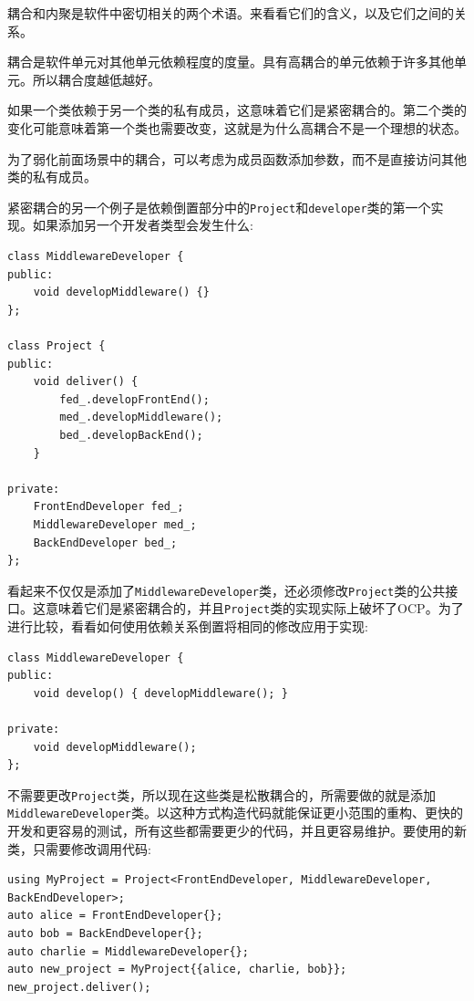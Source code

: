 
耦合和内聚是软件中密切相关的两个术语。来看看它们的含义，以及它们之间的关系。



耦合是软件单元对其他单元依赖程度的度量。具有高耦合的单元依赖于许多其他单元。所以耦合度越低越好。

如果一个类依赖于另一个类的私有成员，这意味着它们是紧密耦合的。第二个类的变化可能意味着第一个类也需要改变，这就是为什么高耦合不是一个理想的状态。

为了弱化前面场景中的耦合，可以考虑为成员函数添加参数，而不是直接访问其他类的私有成员。

紧密耦合的另一个例子是依赖倒置部分中的\texttt{Project}和\texttt{developer}类的第一个实现。如果添加另一个开发者类型会发生什么:


\begin{lstlisting}[style=styleCXX]
class MiddlewareDeveloper {
public:
	void developMiddleware() {}
};

class Project {
public:
	void deliver() {
		fed_.developFrontEnd();
		med_.developMiddleware();
		bed_.developBackEnd();
	}

private:
	FrontEndDeveloper fed_;
	MiddlewareDeveloper med_;
	BackEndDeveloper bed_;
};
\end{lstlisting}

看起来不仅仅是添加了\texttt{MiddlewareDeveloper}类，还必须修改\texttt{Project}类的公共接口。这意味着它们是紧密耦合的，并且\texttt{Project}类的实现实际上破坏了OCP。为了进行比较，看看如何使用依赖关系倒置将相同的修改应用于实现:


\begin{lstlisting}[style=styleCXX]
class MiddlewareDeveloper {
public:
	void develop() { developMiddleware(); }
	
private:
	void developMiddleware();
};
\end{lstlisting}

不需要更改\texttt{Project}类，所以现在这些类是松散耦合的，所需要做的就是添加\texttt{MiddlewareDeveloper}类。以这种方式构造代码就能保证更小范围的重构、更快的开发和更容易的测试，所有这些都需要更少的代码，并且更容易维护。要使用的新类，只需要修改调用代码:

\begin{lstlisting}[style=styleCXX]
using MyProject = Project<FrontEndDeveloper, MiddlewareDeveloper,
BackEndDeveloper>;
auto alice = FrontEndDeveloper{};
auto bob = BackEndDeveloper{};
auto charlie = MiddlewareDeveloper{};
auto new_project = MyProject{{alice, charlie, bob}};
new_project.deliver();
\end{lstlisting}

